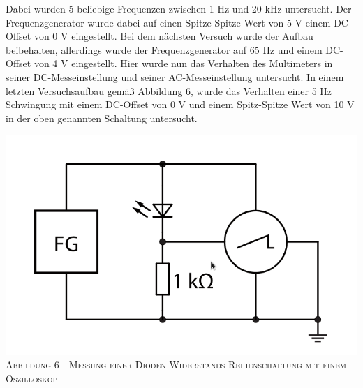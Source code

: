 \documentclass[11pt]{article}
\begin{document}
Dabei wurden 5 beliebige Frequenzen zwischen 1 Hz und 20 kHz untersucht. Der Frequenzgenerator wurde dabei auf einen Spitze-Spitze-Wert von 5 V einem DC-Offset von 0 V eingestellt. Bei dem nächsten Versuch wurde der Aufbau beibehalten, allerdings wurde der Frequenzgenerator auf 65 Hz und einem DC-Offset von 4 V eingestellt. Hier wurde nun das Verhalten des Multimeters in seiner DC-Messeinstellung und seiner AC-Messeinstellung untersucht. In einem letzten Versuchsaufbau gemäß Abbildung 6, wurde das Verhalten einer 5 Hz Schwingung mit einem DC-Offset von 0 V und einem Spitz-Spitze Wert von 10 V in der oben genannten Schaltung untersucht. 
\begin{center}
\includegraphics[scale=0.3]{./nr5.png}\\
\small \textsc{Abbildung 6 - Messung einer Dioden-Widerstands Reihenschaltung mit einem Oszilloskop}\\
\end{center}
\end{document}
